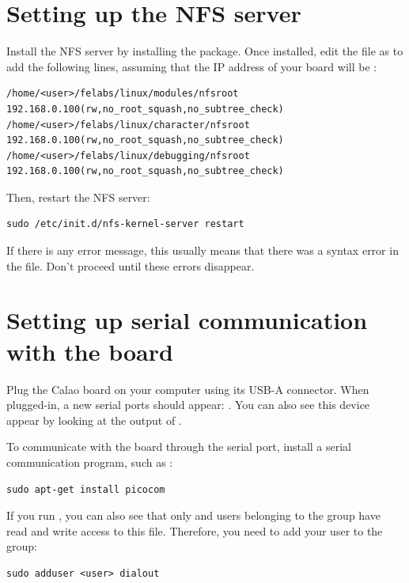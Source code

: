\section{Setting up the NFS server}

Install the NFS server by installing the 
package. Once installed, edit the  file as
 to add the following lines, assuming that the IP address
of your board will be :

\scriptsize
\begin{verbatim}
/home/<user>/felabs/linux/modules/nfsroot 192.168.0.100(rw,no_root_squash,no_subtree_check)
/home/<user>/felabs/linux/character/nfsroot 192.168.0.100(rw,no_root_squash,no_subtree_check)
/home/<user>/felabs/linux/debugging/nfsroot 192.168.0.100(rw,no_root_squash,no_subtree_check)
\end{verbatim}
\normalsize

Then, restart the NFS server:

\begin{verbatim}
sudo /etc/init.d/nfs-kernel-server restart
\end{verbatim}

If there is any error message, this usually means that there was a
syntax error in the  file. Don't proceed until these
errors disappear.

\section{Setting up serial communication with the board}

Plug the Calao board on your computer using its USB-A connector. When
plugged-in, a new serial ports should appear: .
You can also see this device appear by looking at the output of .

To communicate with the board through the serial port, install a serial communication program, such as :

\begin{verbatim}
sudo apt-get install picocom
\end{verbatim}

If you run , you can also see that only
 and users belonging to the  group have
read and write access to this file. Therefore, you need to add your user
to the  group:

\begin{verbatim}
sudo adduser <user> dialout
\end{verbatim}

